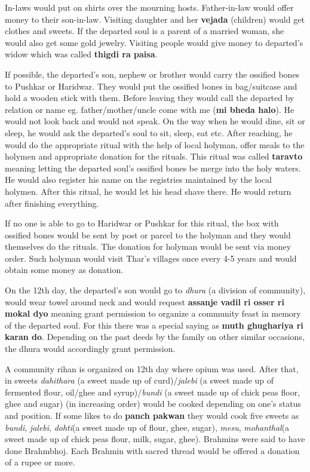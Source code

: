 In-laws would put on shirts over the mourning hosts. Father-in-law would offer
money to their son-in-law. Visiting daughter and her \textbf{vejada} (children)
would get clothes and sweets. If the departed soul is a parent of a married
woman, she would also get some gold jewelry. Visiting people would give money
to departed's widow which was called \textbf{thigdi ra paisa}.

If possible, the departed's son, nephew or brother would carry the ossified
bones to Pushkar or Haridwar. They would put the ossified bones in bag/suitcase
and hold a wooden stick with them. Before leaving they would call the departed
by relation or name eg. father/mother/uncle come with me (\textbf {mi bheda
halo}). He would not look back and would not speak. On the way when he would
dine, sit or sleep, he would ask the departed's soul to sit, sleep, eat etc.
After reaching, he would do the appropriate ritual with the help of local
holyman, offer meals to the holymen and appropriate donation for the rituals.
This ritual was called \textbf{taravto} meaning letting the departed soul's
ossified bones be merge into the holy waters. He would also register his name
on the registries maintained by the local holymen. After this ritual, he would
let his head shave there. He would return after finishing everything.

If no one is able to go to Haridwar or Pushkar for this ritual, the box with
ossified bones would be sent by post or parcel to the holyman and they would
themselves do the rituals. The donation for holyman would be sent via
money order. Such holyman would visit Thar's villages once every 4-5 years and
would obtain some money as donation.

On the 12th day, the departed's son would go to \textit{dhura} (a division of
community), would wear towel around neck and would request \textbf{assanje
vadil ri osser ri mokal dyo} meaning grant permission to organize a community
feast in memory of the departed soul. For this there was a special saying as
\textbf{muth ghughariya ri karan do}. Depending on the past deeds by the family
on other similar occasions, the dhura would accordingly grant permission.

A community rihan is organized on 12th day where opium was used. After that, in
sweets \textit{dahithara} (a sweet made up of curd)/\textit{jalebi} (a sweet
made up of fermented flour, oil/ghee and syrup)/\textit{bundi} (a sweet made up
of chick peas floor, ghee and sugar) (in increasing order) would be cooked
depending on one's status and position. If some likes to do \textbf{panch
pakwan} they would cook five sweets as \textit{bundi}, \textit{jalebi},
\textit{dohti}(a sweet made up of flour, ghee, sugar), \textit{mesu},
\textit{mohanthal}(a sweet made up of chick peas flour, milk, sugar, ghee).
Brahmins were said to have done Brahmbhoj. Each Brahmin with sacred thread
would be offered a donation of a rupee or more.

